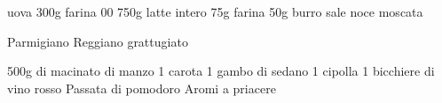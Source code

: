 \begin{ingreds}
 uova
	300g farina 00
	750g latte intero
	75g farina
	50g burro
	sale 
	noce moscata

\columnbreak
	Parmigiano Reggiano grattugiato

	500g di macinato di manzo
	1 carota
	1 gambo di sedano
	1 cipolla
	1 bicchiere di vino rosso
	Passata di pomodoro
	Aromi a priacere

\end{ingreds}


